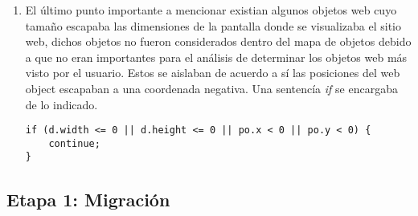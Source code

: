 \begin{enumerate}
		\item El último punto importante a mencionar existian algunos objetos web cuyo tamaño 
		escapaba las dimensiones de la pantalla donde se visualizaba el sitio web, dichos objetos
		no fueron considerados dentro del mapa de objetos debido a que no eran importantes 
		para el análisis de determinar los objetos web más visto por el usuario. Estos 
		se aislaban de acuerdo a sí las posiciones del web object escapaban a una coordenada
		negativa. Una sentencía \textit{if} se encargaba de lo indicado. 
		\begin{lstlisting}[style=Java, caption={Obtención \textit{WebObjects}.}]
if (d.width <= 0 || d.height <= 0 || po.x < 0 || po.y < 0) {
	continue;
}
\end{lstlisting}
        \end{enumerate}
        
	\subsection{Etapa 1: Migración}
	
